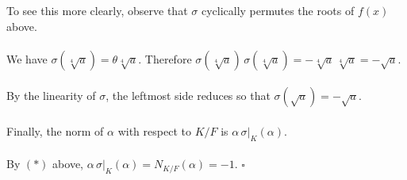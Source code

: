 \documentclass{article}
\begin{document}
\indent To see this more clearly, observe that $\sigma$ cyclically permutes the roots of $f(x)$ above. \\\\
\indent \indent We have $\sigma(\sqrt[4]a) = \theta \sqrt[4]{a}$. Therefore $\sigma(\sqrt[4]{a}) \, \sigma(\sqrt[4]{a}) = - \sqrt[4]{a} \, \sqrt[4]{a} = - \sqrt{a}$. \\\\
\indent \indent By the linearity of $\sigma$, the leftmost side reduces so that $\sigma(\sqrt{a}) = - \sqrt{a}$.\\\\
Finally, the norm of $\alpha$ with respect to $K/F$ is $\alpha \, \sigma|_K(\alpha)$. \\\\
By $(\ast)$ above, $\alpha \, \sigma|_K(\alpha) = N_{K/F}(\alpha) = -1$. $\square$ \\\\
\pagebreak
\end{document}
